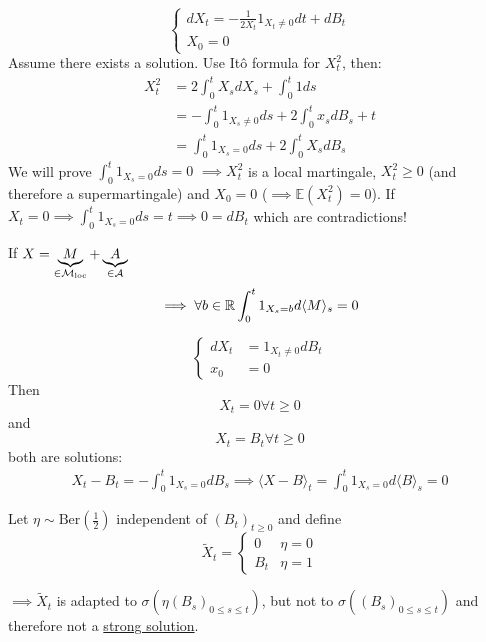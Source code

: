 \begin{example}[No solutions]\label{ex:1.8}
    \begin{equation}
        \begin{cases}
            dX_t=-\frac{1}{2X_t}1_{X_t\neq 0}dt+dB_t\\
            X_0=0
        \end{cases}        
    \end{equation}
    Assume there exists a solution. Use Itô formula for $X_t^2$, then:
    \begin{align*}
        X_t^2&=2\int_0^t X_s dX_s +\int_0^t 1 ds\\
        &=-\int_0^t 1_{X_s\neq 0}ds +2\int_0^t x_s dB_s+t\\
        &=\int_0^t 1_{X_s=0}ds+2\int_0^t X_s dB_s
    \end{align*}
    We will prove $\int_0^t 1_{X_s=0}ds=0$ $\implies X_t^2$ is a local martingale, $X_t^2\geq 0$ (and therefore a supermartingale) and $X_0=0$ ($\implies \mathbb{E}(X_t^2)=0$). 
    If $X_t=0\implies \int_0^t 1_{X_s=0}ds=t\implies 0=dB_t$ which are contradictions!
\end{example}

\begin{remark}
    If $X=\underbrace{M}_{\in\mathcal{M}_{\text{loc}}}+\underbrace{A}_{\in\mathcal{A}}$
    \[\implies \forall b\in \mathbb{R}\int_0^t 1_{X_s=b}d \langle M\rangle_s=0\]
\end{remark}




\begin{example}
    \[\begin{cases}
        dX_t &= 1_{X_t\neq 0}dB_t\\
        x_0&=0
    \end{cases}\]
    Then \[X_t=0\forall t\geq 0\] and
    \[X_t=B_t\forall t\geq 0\] 
    both are solutions:
    \begin{align*}
        X_t-B_t=-\int_{0}^t1_{X_s=0}dB_s\implies \langle X-B\rangle_t =\int_0^t 1_{X_s=0}d\langle B\rangle_s=0
    \end{align*}

    Let $\eta\sim\text{Ber}\left(\frac{1}{2}\right)$ independent of $(B_t)_{t\geq 0}$
    and define 
    \[\tilde{X}_t=\begin{cases}
        0 & \eta=0\\
        B_t & \eta=1
    \end{cases}\]

    $\implies \tilde{X}_t$ is adapted to $\sigma(\eta(B_s)_{0\leq s\leq t})$, but not to $\sigma((B_s)_{0\leq s\leq t})$ and therefore not a 
    \hyperref[def:strong_solution]{strong solution}.

\end{example}

